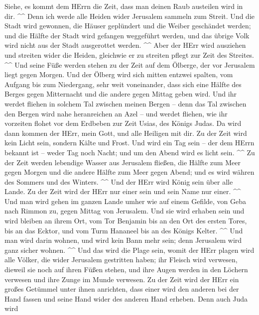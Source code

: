  Siehe, es kommt dem HErrn die Zeit, dass man deinen Raub
austeilen wird in dir. \^{}\^{}  Denn ich werde alle Heiden
wider Jerusalem sammeln zum Streit. Und die Stadt wird gewonnen, die
Häuser geplündert und die Weiber geschändet werden; und die Hälfte der
Stadt wird gefangen weggeführt werden, und das übrige Volk wird nicht
aus der Stadt ausgerottet werden. \^{}\^{}  Aber der HErr
wird ausziehen und streiten wider die Heiden, gleichwie er zu streiten
pflegt zur Zeit des Streites. \^{}\^{}  Und seine Füße
werden stehen zu der Zeit auf dem Ölberge, der vor Jerusalem liegt gegen
Morgen. Und der Ölberg wird sich mitten entzwei spalten, vom Aufgang bis
zum Niedergang, sehr weit voneinander, dass sich eine Hälfte des Berges
gegen Mitternacht und die andere gegen Mittag geben wird. 
Und ihr werdet fliehen in solchem Tal zwischen meinen Bergen -- denn das
Tal zwischen den Bergen wird nahe heranreichen an Azel -- und werdet
fliehen, wie ihr vorzeiten flohet vor dem Erdbeben zur Zeit Usias, des
Königs Judas. Da wird dann kommen der HErr, mein Gott, und alle Heiligen
mit dir.  Zu der Zeit wird kein Licht sein, sondern Kälte
und Frost.  Und wird ein Tag sein -- der dem HErrn bekannt
ist -- weder Tag noch Nacht; und um den Abend wird es licht sein.
\^{}\^{}  Zu der Zeit werden lebendige Wasser aus Jerusalem
fließen, die Hälfte zum Meer gegen Morgen und die andere Hälfte zum Meer
gegen Abend; und es wird währen des Sommers und des Winters. \^{}\^{}
 Und der HErr wird König sein über alle Lande. Zu der Zeit
wird der HErr nur einer sein und sein Name nur einer. \^{}\^{}
 Und man wird gehen im ganzen Lande umher wie auf einem
Gefilde, von Geba nach Rimmon zu, gegen Mittag von Jerusalem. Und sie
wird erhaben sein und wird bleiben an ihrem Ort, vom Tor Benjamin bis an
den Ort des ersten Tores, bis an das Ecktor, und vom Turm Hananeel bis
an des Königs Kelter. \^{}\^{}  Und man wird darin wohnen,
und wird kein Bann mehr sein; denn Jerusalem wird ganz sicher wohnen.
\^{}\^{}  Und das wird die Plage sein, womit der HErr
plagen wird alle Völker, die wider Jerusalem gestritten haben; ihr
Fleisch wird verwesen, dieweil sie noch auf ihren Füßen stehen, und ihre
Augen werden in den Löchern verwesen und ihre Zunge im Munde verwesen.
 Zu der Zeit wird der HErr ein großes Getümmel unter ihnen
anrichten, dass einer wird den anderen bei der Hand fassen und seine
Hand wider des anderen Hand erheben.  Denn auch Juda wird
